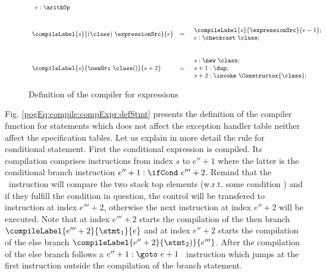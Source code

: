 \begin{figure}[ht!]
\begin{frameit}
$${\begin{array}{lll}
\begin{array}{l}
                       e:\arithOp
                 \end{array}  \\
	& & \\ & & \\
	\compileLabel{s}{ (\class ) \ \expressionSrc }{e} & = &  
              \begin{array}{l}  
                 \compileLabel{s}{\expressionSrc}{e  - 1};\\
                  e : \checkcast \ \class ;
              \end{array}	 \\
	& & \\ & & \\ 

\compileLabel{s}{ \newSrc \ \class  ( ) }{s+2} & = & 
                 \begin{array}{l}
                       s :    \new \ \class; \\ 
		       s + 1: \dup; \\
		       s + 2 : \invoke \ \Constructor{\class};     
	       \end{array}

	\end{array} 
} $$

\caption{\sc Definition of the compiler for expressions }
\label{pogEq:compile:compExpr:defExpr}
\end{frameit}
\end{figure}

Fig. \ref{pogEq:compile:compExpr:defStmt} presents the definition 
of the compiler function for statements which does not affect the exception handler table 
neither affect the specification tables.
Let us explain in more detail the rule for 
conditional statement. First the conditional expression is compiled. Its compilation comprises 
instructions from index $s$ to $e''+1$ 
where the latter is the  conditional branch instruction $e'' + 1: \ifCond \ e''' + 2$. Remind that the \ifCond \ 
instruction will compare the two stack top elements  (w.r.t. some condition ) and if they fulfill the condition
in question, the control will be transfered to instruction at index $ e''' +2 $, otherwise the next instruction
at index $e'' + 2$ will be executed. Note that at index $ e'''+2$ starts the compilation of the then branch 
$\compileLabel{e''' +  2}{\stmt_1}{ e  }$ and at index $ e''+2$ starts the compilation of the else branch 
$\compileLabel{e'' + 2}{\stmt_2)}{e'''}$. After the compilation of the else branch follows a $ e'' + 1: \goto \ e + 1$ \ instruction
which jumps at the first instruction  outside the compilation of the branch statement. 

